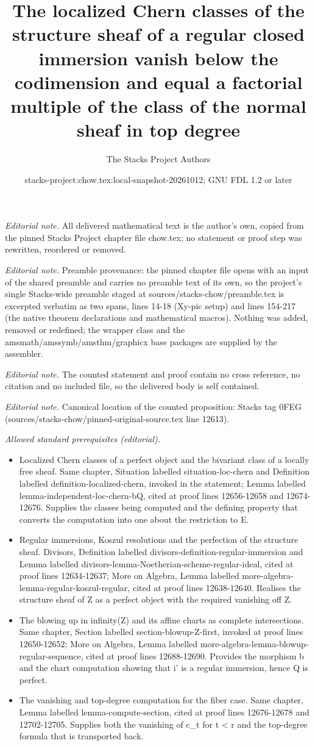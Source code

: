 \documentclass[10pt,a4paper]{amsart}
\title{The localized Chern classes of the structure sheaf of a regular closed immersion vanish below the codimension and equal a factorial multiple of the class of the normal sheaf in top degree}
\author{The Stacks Project Authors}
\date{stacks-project:chow.tex:local-snapshot-20261012; GNU FDL 1.2 or later}
\theoremstyle{plain}
\theoremstyle{definition}
\theoremstyle{remark}
\numberwithin{equation}{subsection}
\begin{document}
\maketitle
\noindent\textit{Editorial note.} All delivered mathematical text is the author's own, copied from the pinned Stacks Project chapter file chow.tex; no statement or proof step was rewritten, reordered or removed.\par\medskip
\noindent\textit{Editorial note.} Preamble provenance: the pinned chapter file opens with an input of the shared preamble and carries no preamble text of its own, so the project's single Stacks-wide preamble staged at sources/stacks-chow/preamble.tex is excerpted verbatim as two spans, lines 14-18 (Xy-pic setup) and lines 154-217 (the native theorem declarations and mathematical macros). Nothing was added, removed or redefined; the wrapper class and the amsmath/amssymb/amsthm/graphicx base packages are supplied by the assembler.\par\medskip
\noindent\textit{Editorial note.} The counted statement and proof contain no cross reference, no citation and no included file, so the delivered body is self contained.\par\medskip
\noindent\textit{Editorial note.} Canonical location of the counted proposition: Stacks tag 0FEG (sources/stacks-chow/pinned-original-source.tex line 12613).\par\medskip
\noindent\textit{Allowed standard prerequisites (editorial).}\begin{itemize}
\item Localized Chern classes of a perfect object and the bivariant class of a locally free sheaf. Same chapter, Situation labelled situation-loc-chern and Definition labelled definition-localized-chern, invoked in the statement; Lemma labelled lemma-independent-loc-chern-bQ, cited at proof lines 12656-12658 and 12674-12676. Supplies the classes being computed and the defining property that converts the computation into one about the restriction to E.
\item Regular immersions, Koszul resolutions and the perfection of the structure sheaf. Divisors, Definition labelled divisors-definition-regular-immersion and Lemma labelled divisors-lemma-Noetherian-scheme-regular-ideal, cited at proof lines 12634-12637; More on Algebra, Lemma labelled more-algebra-lemma-regular-koszul-regular, cited at proof lines 12638-12640. Realises the structure sheaf of Z as a perfect object with the required vanishing off Z.
\item The blowing up in infinity(Z) and its affine charts as complete intersections. Same chapter, Section labelled section-blowup-Z-first, invoked at proof lines 12650-12652; More on Algebra, Lemma labelled more-algebra-lemma-blowup-regular-sequence, cited at proof lines 12688-12690. Provides the morphism b and the chart computation showing that i' is a regular immersion, hence Q is perfect.
\item The vanishing and top-degree computation for the fiber case. Same chapter, Lemma labelled lemma-compute-section, cited at proof lines 12676-12678 and 12702-12705. Supplies both the vanishing of c\_t for t < r and the top-degree formula that is transported back.
\end{itemize}\medskip
\end{document}
